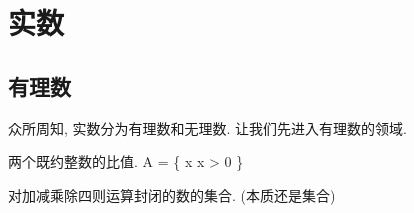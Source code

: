 \chapter{实数}

\section{有理数}

众所周知, 实数分为有理数和无理数. 让我们先进入有理数的领域. 

\begin{defination}[有理数]
    两个既约整数的比值. 
    A = \{ x \in {} \mid x > 0 \}
\end{defination}

\begin{definition}[数域]
    对加减乘除四则运算封闭的数的集合. (本质还是集合)
\end{definition}
\begin{comment}
    if a \in \mathbb{R} and b \in \mathbb{R}. 
    then a+b, a-b, a*b, a/b \in \mathbb{R}. 
\end{comment}